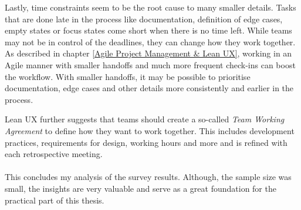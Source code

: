 Lastly, time constraints seem to be the root cause to many smaller details. Tasks that are done late
in the process like documentation, definition of edge cases, empty states or focus states come short
when there is no time left. While teams may not be in control of the deadlines, they can change how
they work together. As described in chapter \ref{Agile Project Management & Lean UX}, working in an
Agile manner with smaller handoffs and much more frequent check-ins can boost the workflow. With
smaller handoffs, it may be possible to prioritise documentation, edge cases and other details more
consistently and earlier in the process.

Lean UX further suggests that teams should create a so-called \textit{Team Working Agreement} to
define how they want to work together. This includes development practices, requirements for design,
working hours and more and is refined with each retrospective meeting.
 \\\\

This concludes my analysis of the survey results. Although, the sample size was small, the insights
are very valuable and serve as a great foundation for the practical part of this thesis.
